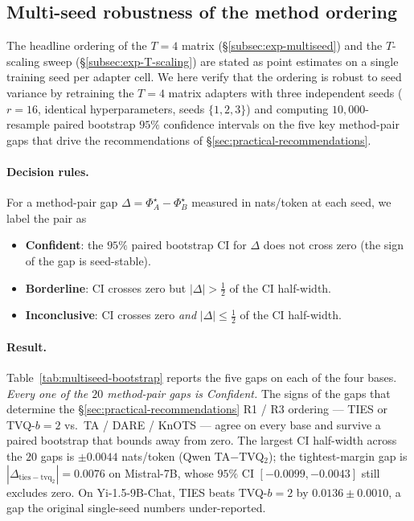 
\subsection{Multi-seed robustness of the method ordering}
\label{subsec:exp-multiseed-bootstrap}

The headline ordering of the $T = 4$ matrix
(\S\ref{subsec:exp-multiseed}) and the $T$-scaling sweep
(\S\ref{subsec:exp-T-scaling}) are stated as point estimates on a
single training seed per adapter cell. We here verify that the
ordering is robust to seed variance by retraining the $T = 4$ matrix
adapters with three independent seeds ($r = 16$, identical
hyperparameters, seeds $\{1, 2, 3\}$) and computing $10{,}000$-resample
paired bootstrap $95\%$ confidence intervals on the five key
method-pair gaps that drive the recommendations of
\S\ref{sec:practical-recommendations}.

\paragraph{Decision rules.} For a method-pair gap
$\Delta = \Phi^\star_A - \Phi^\star_B$ measured in nats/token at
each seed, we label the pair as
\begin{itemize}[topsep=2pt,itemsep=2pt]
  \item \textbf{Confident}: the $95\%$ paired bootstrap CI for $\Delta$
        does not cross zero (the sign of the gap is seed-stable).
  \item \textbf{Borderline}: CI crosses zero but
        $|\Delta| > \tfrac{1}{2}$ of the CI half-width.
  \item \textbf{Inconclusive}: CI crosses zero \emph{and}
        $|\Delta| \leq \tfrac{1}{2}$ of the CI half-width.
\end{itemize}

\paragraph{Result.} Table~\ref{tab:multiseed-bootstrap} reports the
five gaps on each of the four bases. \emph{Every one of the $20$
method-pair gaps is Confident.} The signs of the gaps that determine
the \S\ref{sec:practical-recommendations} R1 / R3 ordering ---
TIES or TVQ-$b{=}2$ vs.\ TA / DARE / KnOTS --- agree on every base
and survive a paired bootstrap that bounds away from zero. The
largest CI half-width across the $20$ gaps is $\pm 0.0044$
nats/token (Qwen TA$-$TVQ$_2$); the tightest-margin gap is
$|\Delta_{\mathrm{ties-tvq_2}}| = 0.0076$ on Mistral-7B, whose $95\%$
CI $[-0.0099, -0.0043]$ still excludes zero. On
Yi-1.5-9B-Chat, TIES beats TVQ-$b{=}2$ by $0.0136 \pm 0.0010$, a gap
the original single-seed numbers under-reported.

